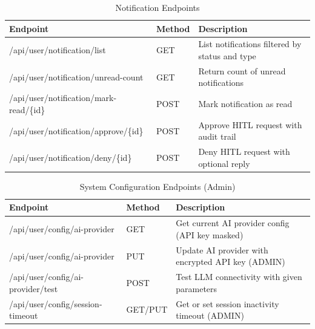 \begin{table}[H]
\small\singlespacing
\centering
\caption{Notification Endpoints}
\label{tab:api-notifications}
\begin{tabularx}{\textwidth}{>{\RaggedRight\arraybackslash}p{}>{\RaggedRight\arraybackslash}p{1.3cm}>{\RaggedRight\arraybackslash}X}
\toprule
\textbf{Endpoint} & \textbf{Method} & \textbf{Description} \\
\midrule
/api/user/notification/list & GET & List notifications filtered by status and type \\
/api/user/notification/unread-count & GET & Return count of unread notifications \\
/api/user/notification/mark-read/\{id\} & POST & Mark notification as read \\
/api/user/notification/approve/\{id\} & POST & Approve HITL request with audit trail \\
/api/user/notification/deny/\{id\} & POST & Deny HITL request with optional reply \\
\bottomrule
\end{tabularx}
\end{table}

\begin{table}[H]
\small\singlespacing
\centering
\caption{System Configuration Endpoints (Admin)}
\label{tab:api-config}
\begin{tabularx}{\textwidth}{>{\RaggedRight\arraybackslash}p{}>{\RaggedRight\arraybackslash}p{1.3cm}>{\RaggedRight\arraybackslash}X}
\toprule
\textbf{Endpoint} & \textbf{Method} & \textbf{Description} \\
\midrule
/api/user/config/ai-provider & GET & Get current AI provider config (API key masked) \\
/api/user/config/ai-provider & PUT & Update AI provider with encrypted API key (ADMIN) \\
/api/user/config/ai-provider/test & POST & Test LLM connectivity with given parameters \\
/api/user/config/session-timeout & GET/PUT & Get or set session inactivity timeout (ADMIN) \\
\bottomrule
\end{tabularx}
\end{table}



